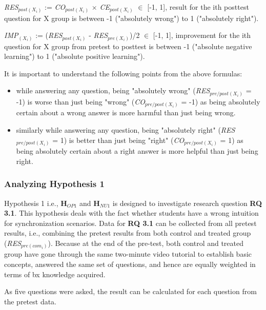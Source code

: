 \textit{RES$_{post(X_i)}$} := \textit{CO$_{post(X_i)}$} $\times$ \textit{CE$_{post(X_i)}$} $\in$ [-1,  1], result for the ith posttest question for X group is between -1 ("absolutely wrong") to 1 ("absolutely right").

\textit{IMP$_{(X_i)}$} := (\textit{RES$_{post(X_i)}$} - \textit{RES$_{pre(X_i)}$})/2 $\in$ [-1,  1], improvement for the ith question for X group from pretest to posttest is between -1 ("absolute negative learning") to 1 ("absolute positive learning").

It is important to understand the following points from the above formulas:
\begin{itemize}
	\item while answering any question, being "absolutely wrong" (\textit{RES$_{pre/post(X_i)}$} = -1) is worse than just being "wrong" (\textit{CO$_{pre/post(X_i)}$} = -1) as being absolutely certain about a wrong answer is more harmful than just being wrong.
	\item similarly while answering any question, being "absolutely right" (\textit{RES$_{pre/post(X_i)}$} = 1) is better than just being "right" (\textit{CO$_{pre/post(X_i)}$} = 1) as being absolutely certain about a right answer is more helpful than just being right.
\end{itemize} 

\subsubsection{Analyzing Hypothesis 1}\label{subsubsec:hypothesis1}
Hypothesis 1 i.e., \textbf{H$_{OP1}$} and \textbf{H$_{NU1}$} is designed to investigate research question \textbf{RQ 3.1}. This hypothesis deals with the fact whether students have a wrong intuition for synchronization scenarios. Data for \textbf{RQ 3.1} can be collected from all pretest results, i.e., combining the pretest results from both control and treated group (\textit{RES$_{pre(com_i)}$}). Because at the end of the pre-test, both control and treated group have gone through the same two-minute video tutorial to establish basic concepts, answered the same set of questions, and hence are equally weighted in terms of bx knowledge acquired.

As five questions were asked, the result can be calculated for each question from the pretest data. 

